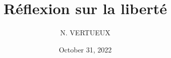\documentclass[]{cls/tools}
\begin{document}
\title{Réflexion sur la liberté}

\author{N. VERTUEUX}
\date{October 31, 2022}

\maketitle
\end{document}
